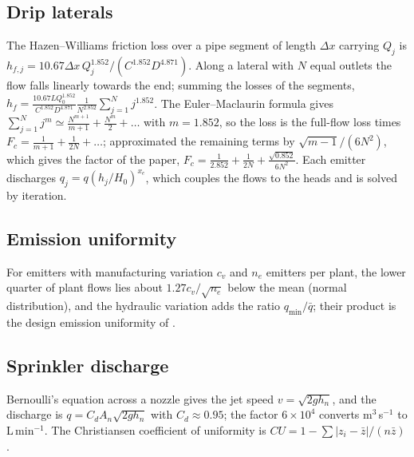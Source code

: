 \subsection{Drip laterals}
The Hazen--Williams friction loss over a pipe segment of length $\Delta x$ carrying $Q_j$ is $h_{f,j}=10.67\Delta x\,Q_j^{1.852}/(C^{1.852}D^{4.871})$. Along a lateral with $N$ equal outlets the flow falls linearly towards the end; summing the losses of the segments, $h_f=\frac{10.67LQ_0^{1.852}}{C^{1.852}D^{4.871}}\frac1{N^{2.852}}\sum_{j=1}^{N}j^{1.852}$. The Euler--Maclaurin formula gives $\sum_{j=1}^Nj^{m}\simeq\frac{N^{m+1}}{m+1}+\frac{N^m}{2}+\dots$ with $m=1.852$, so the loss is the full-flow loss times $F_c=\frac1{m+1}+\frac1{2N}+\dots$; \citet{Christiansen1942} approximated the remaining terms by $\sqrt{m-1}/(6N^2)$, which gives the factor of the paper, $F_c=\frac1{2.852}+\frac1{2N}+\frac{\sqrt{0.852}}{6N^2}$. Each emitter discharges $q_j=q(h_j/H_0)^{x_e}$, which couples the flows to the heads and is solved by iteration.

\subsection{Emission uniformity}
For emitters with manufacturing variation $c_v$ and $n_e$ emitters per plant, the lower quarter of plant flows lies about $1.27c_v/\sqrt{n_e}$ below the mean (normal distribution), and the hydraulic variation adds the ratio $q_{\min}/\bar q$; their product is the design emission uniformity of \citet{KellerKarmeli1974}.

\subsection{Sprinkler discharge}
Bernoulli's equation across a nozzle gives the jet speed $v=\sqrt{2gh_n}$, and the discharge is $q=C_dA_n\sqrt{2gh_n}$ with $C_d\approx0.95$; the factor $6\times10^4$ converts m$^3$\,s$^{-1}$ to L\,min$^{-1}$. The Christiansen coefficient of uniformity is $CU=1-\sum|z_i-\bar z|/(n\bar z)$.

